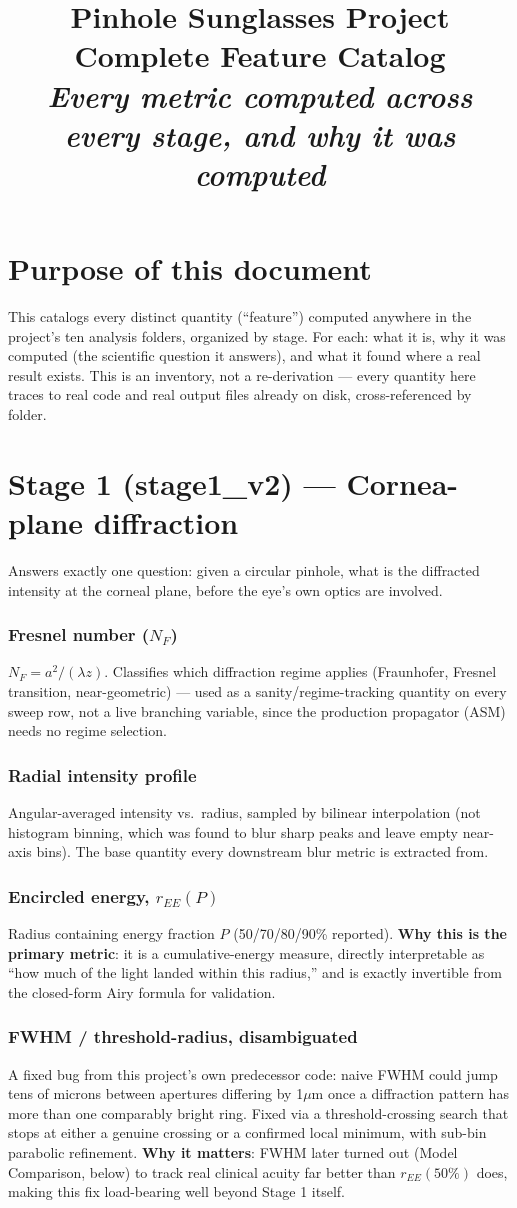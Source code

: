 \documentclass[10pt]{report}
\title{\textbf{\Large Pinhole Sunglasses Project}\\[0.2cm]\textcolor{hbblue}{\large Complete Feature Catalog}\\[0.3cm]
\normalsize\itshape Every metric computed across every stage, and why it was computed}
\author{}
\date{}
\newcommand{\feat}[1]{\subsection*{#1}}
\begin{document}
\maketitle
\tableofcontents

\chapter{Purpose of this document}
This catalogs every distinct quantity (``feature'') computed anywhere in the project's ten analysis folders, organized by stage. For each: what it is, why it was computed (the scientific question it answers), and what it found where a real result exists. This is an inventory, not a re-derivation --- every quantity here traces to real code and real output files already on disk, cross-referenced by folder.

\chapter{Stage 1 (stage1\_v2) --- Cornea-plane diffraction}
Answers exactly one question: given a circular pinhole, what is the diffracted intensity at the corneal plane, before the eye's own optics are involved.

\feat{Fresnel number ($N_F$)}
$N_F = a^2/(\lambda z)$. Classifies which diffraction regime applies (Fraunhofer, Fresnel transition, near-geometric) --- used as a sanity/regime-tracking quantity on every sweep row, not a live branching variable, since the production propagator (ASM) needs no regime selection.

\feat{Radial intensity profile}
Angular-averaged intensity vs.\ radius, sampled by bilinear interpolation (not histogram binning, which was found to blur sharp peaks and leave empty near-axis bins). The base quantity every downstream blur metric is extracted from.

\feat{Encircled energy, $r_{EE}(P)$}
Radius containing energy fraction $P$ (50/70/80/90\% reported). \textbf{Why this is the primary metric}: it is a cumulative-energy measure, directly interpretable as ``how much of the light landed within this radius,'' and is exactly invertible from the closed-form Airy formula for validation.

\feat{FWHM / threshold-radius, disambiguated}
A fixed bug from this project's own predecessor code: naive FWHM could jump tens of microns between apertures differing by 1$\mu$m once a diffraction pattern has more than one comparably bright ring. Fixed via a threshold-crossing search that stops at either a genuine crossing or a confirmed local minimum, with sub-bin parabolic refinement. \textbf{Why it matters}: FWHM later turned out (Model Comparison, below) to track real clinical acuity far better than $r_{EE}(50\%)$ does, making this fix load-bearing well beyond Stage 1 itself.
\end{document}
